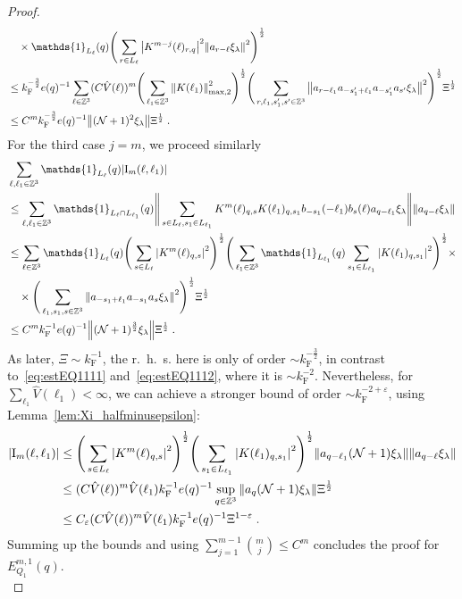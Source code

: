 \documentclass[12pt,a4paper]{article}
\numberwithin{equation}{section}
\newcommand{\1}{\mathbb{I}}
\newcommand{\F}{\mathrm{F}}
\newcommand{\I}{\mathrm{I}}
\newcommand{\Zstar}{\mathbb{Z}^3} %
\newcommand{\Z}{\mathbb{Z}}
\newcommand{\NN}{\mathcal{N}}
\newcommand{\half}{\frac{1}{2}}
\theoremstyle{plain}
\theoremstyle{definition}
\theoremstyle{remark}
\theoremstyle{plain}
\theoremstyle{definition}
\theoremstyle{remark}
\begin{document}
\begin{proof}
\begin{align}
	&\quad \times \mathds{1}_{L_\ell}(q) \Bigg( \sum\limits_{r\in L_{\ell}} \abs{K^{m-j}(\ell)_{r,q}}^2 \norm{a_{r-\ell} \xi_\lambda }^2 \Bigg)^\half\nonumber\\
	&\leq k_{\F}^{-\frac 32} e(q)^{-1}
		\sum_{\ell \in \Zstar} (C \hat{V}(\ell))^m
		\Bigg( \sum_{\ell_1 \in \Zstar} \norm{K(\ell_1)}_{\max,2}^2 \Bigg)^{\half} 
		\Bigg( \sum\limits_{r,\ell_1,s_1',s' \in \Z^3} \norm{a_{r-\ell_1} a_{-s_1'+\ell_1} a_{-s_1'} a_{s'} \xi_\lambda}^2 \Bigg)^\half
		\Xi^\half \nonumber\\
	&\leq C^m k_{\F}^{-\frac 32} e(q)^{-1}
		\norm{(\NN+1)^2 \xi_\lambda} \Xi^\half \;. \label{eq:estEQ1112}
\end{align}
For the third case $ j = m $, we proceed similarly
\begin{align}
	& \sum_{\ell,\ell_1 \in \Zstar} \mathds{1}_{L_\ell}(q) |\I_m(\ell, \ell_1)| \nonumber\\
	&\leq \sum_{\ell,\ell_1 \in \Zstar} \mathds{1}_{L_\ell \cap L_{\ell_1}}(q)
		\Bigg\Vert \sum\limits_{s\in L_{\ell}, s_1 \in L_{\ell_1}} K^m(\ell)_{q,s}K(\ell_1)_{q,s_1} b_{-s_1}(-\ell_1) b_{s}(\ell) a_{q-\ell_1}\xi_\lambda \Bigg\Vert
		\norm{ a_{q-\ell}\xi_\lambda }\nonumber\\
	&\leq \sum_{\ell \in \Zstar} \mathds{1}_{L_\ell}(q) \Bigg(\sum\limits_{s \in L_{\ell}} \abs{K^m(\ell)_{q,s}}^2\Bigg)^\half 
		\Bigg(\sum_{\ell_1 \in \Zstar} \mathds{1}_{L_{\ell_1}}(q) \sum\limits_{s_1 \in L_{\ell_1}} \abs{K(\ell_1)_{q,s_1}}^2\Bigg)^\half \times \nonumber\\
	&\quad \times \Bigg( \sum_{\ell_1, s_1, s \in \Z^3} \norm{ a_{-s_1+\ell_1} a_{-s_1} a_s \xi_\lambda}^2 \Bigg)^{\half} \Xi^\half \nonumber\\
	&\leq C^m k_{\F}^{-1} e(q)^{-1} \norm{ (\NN+1)^{\frac 32} \xi_\lambda}\Xi^\half \;. \label{eq:estEQ1113_Coulomb}
\end{align}
As later, $ \Xi \sim k_{\F}^{-1} $, the r.~h.~s. here is only of order $ \sim k_{\F}^{-\frac 32} $, in contrast to~\eqref{eq:estEQ1111} and~\eqref{eq:estEQ1112}, where it is $ \sim k_{\F}^{-2} $. Nevertheless, for $ \sum_{\ell_1} \hat{V}(\ell_1) < \infty $, we can achieve a stronger bound of order $ \sim k_{\F}^{-2 + \varepsilon} $, using Lemma~\ref{lem:Xi_halfminusepsilon}:
\begin{align}
	|\I_m(\ell, \ell_1)|
	&\leq \Bigg(\sum\limits_{s \in L_{\ell}} \abs{K^m(\ell)_{q,s}}^2\Bigg)^\half \Bigg(\sum\limits_{s_1 \in L_{\ell_1}} \abs{K(\ell_1)_{q,s_1}}^2\Bigg)^\half \norm{ a_{q-\ell_1} (\NN+1)\xi_\lambda} \norm{ a_{q-\ell}\xi_\lambda }\nonumber\\
	&\leq (C \hat{V}(\ell))^m \hat{V}(\ell_1) k_{\F}^{-1} e(q)^{-1} \sup_{q \in \Z^3}\norm{ a_{q} (\NN+1) \xi_\lambda}\Xi^\half\nonumber\\
	&\leq C_\varepsilon (C \hat{V}(\ell))^m \hat{V}(\ell_1) k_{\F}^{-1} e(q)^{-1} \Xi^{1-\varepsilon} \;. \label{eq:estEQ1113}
\end{align}
Summing up the bounds and using $\sum_{j=1}^{m-1} {{m}\choose j} \le C^m $ concludes the proof for $ E^{m,1}_{Q_1}(q) $.\\


\end{proof}
\end{document}
